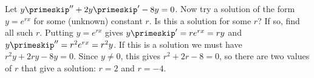 {Let $y\primeskip'' + 2y\primeskip' - 8y = 0$.  Now try a solution of the form $y = e^{rx}$ for
some (unknown) constant $r$.  Is this a solution
for some $r$?  If so, find all such $r$.}
{Putting $y=e^{rx}$ gives $y\primeskip' = re^{rx} = ry$ and $y\primeskip'' = r^2e^{rx}=r^2y$. If this is a solution we must have $r^2y+2ry-8y=0$. Since $y\neq 0$, this gives $r^2+2r-8=0$, so there are two values of $r$ that give a solution: $r=2$ and $r=-4$.}